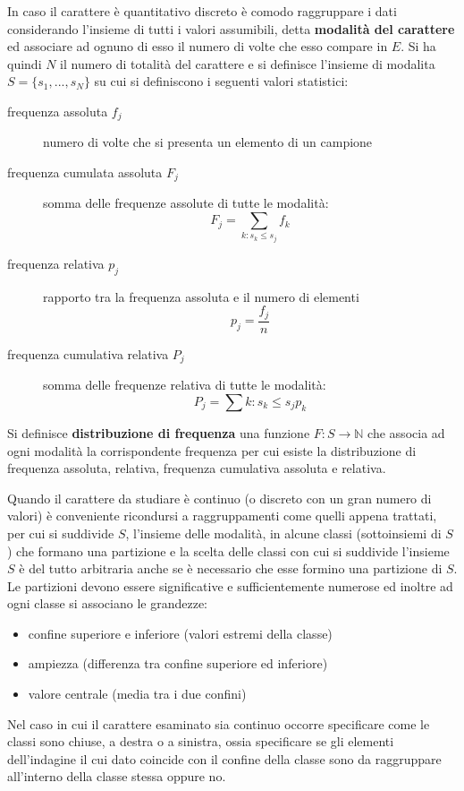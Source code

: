 \documentclass[a4paper,12pt, oneside]{book}
\newcommand{\numberset}{\mathbb}
\newcommand{\N}{\numberset{N}}
\begin{document}
In caso il carattere è quantitativo discreto è comodo raggruppare i dati considerando 
l'insieme di tutti i valori assumibili, detta \textbf{modalità del carattere} ed associare ad ognuno 
di esso il numero di volte che esso compare in $E$.\newline
Si ha quindi $N$ il numero di totalità del carattere e si definisce l'insieme di modalita
$S=\{s_1,...,s_N\}$ su cui si definiscono i seguenti valori statistici:
\begin{description}
    \item [frequenza assoluta $f_j$] numero di volte che si presenta un elemento di un campione
    \item [frequenza cumulata assoluta $F_j$] somma delle frequenze assolute di tutte le modalità:
            \[ F_j = \sum_{k:s_k \leq s_j} f_k \]
    \item [frequenza relativa $p_j$] rapporto tra la frequenza assoluta e il numero di elementi 
            \[ p_j = \frac{f_j}{n} \]
    \item [frequenza cumulativa relativa $P_j$] somma delle frequenze relativa di tutte le modalità:
            \[ P_j = \sum{k:s_k \leq s_j} p_k \]
\end{description}
Si definisce \textbf{distribuzione di frequenza} una funzione $F:S \to \N$ che associa ad ogni modalità la corrispondente frequenza
per cui esiste la distribuzione di frequenza assoluta, relativa, frequenza cumulativa assoluta e relativa.

Quando il carattere da studiare è continuo (o discreto con un gran numero di valori) è conveniente 
ricondursi a raggruppamenti come quelli appena trattati, per cui si suddivide $S$, l'insieme delle modalità,
in alcune classi (sottoinsiemi di $S$) che formano una partizione e la scelta delle classi con cui 
si suddivide l'insieme $S$ è del tutto arbitraria anche se è necessario che esse formino una partizione di $S$.\newline
Le partizioni devono essere significative e sufficientemente numerose ed inoltre ad ogni classe si associano le grandezze:
\begin{itemize}
    \item confine superiore e inferiore (valori estremi della classe)
    \item ampiezza (differenza tra confine superiore ed inferiore)
    \item valore centrale (media tra i due confini)
\end{itemize}
Nel caso in cui il carattere esaminato sia continuo occorre specificare come le classi sono chiuse, a destra o a sinistra,
ossia specificare se gli elementi dell'indagine il cui dato coincide con il confine della classe sono da raggruppare
all'interno della classe stessa oppure no.
\end{document}
